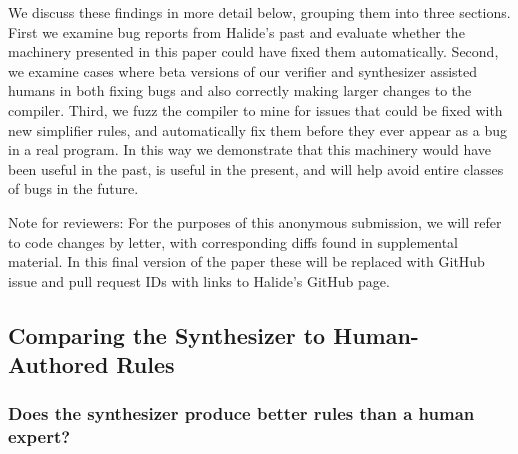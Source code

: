 \documentclass[acmsmall,review,anonymous]{acmart}\settopmatter{printfolios=true,printccs=false,printacmref=false}
\begin{document}
We discuss these findings in more detail below, grouping them into three sections. First we examine bug reports from Halide’s past and evaluate whether the machinery presented in this paper could have fixed them automatically. Second, we examine cases where beta versions of our verifier and synthesizer assisted humans in both fixing bugs and also correctly making larger changes to the compiler. Third, we fuzz the compiler to mine for issues that could be fixed with new simplifier rules, and automatically fix them before they ever appear as a bug in a real program. In this way we demonstrate that this machinery would have been useful in the past, is useful in the present, and will help avoid entire classes of bugs in the future.

Note for reviewers: For the purposes of this anonymous submission, we will refer to code changes by letter, with corresponding diffs found in supplemental material. In this final version of the paper these will be replaced with GitHub issue and pull request IDs with links to Halide’s GitHub page.

\subsection{Comparing the Synthesizer to Human-Authored Rules}

\subsubsection{Does the synthesizer produce better rules than a human expert?}
\label{sub:bugfixes}



\end{document}
